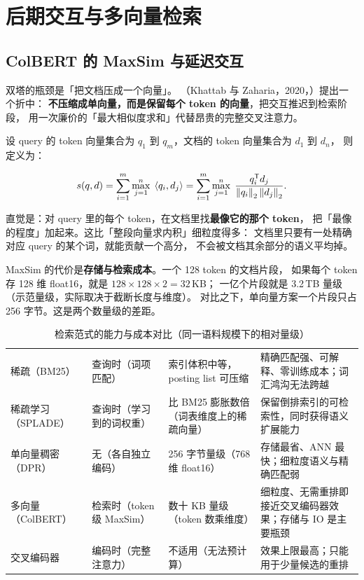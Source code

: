 \section{后期交互与多向量检索}

\subsection{ColBERT 的 MaxSim 与延迟交互}

双塔的瓶颈是「把文档压成一个向量」。
（Khattab 与 Zaharia，2020，\cite{khattab2020colbert}）提出一个折中：
\textbf{不压缩成单向量，而是保留每个 token 的向量}，把交互推迟到检索阶段，
用一次廉价的「最大相似度求和」代替昂贵的完整交叉注意力。

设 query 的 token 向量集合为 $q_1$ 到 $q_m$，文档的 token 向量集合为 $d_1$ 到 $d_n$，
则 定义为：

\begin{equation}
s(q, d) = \sum_{i=1}^{m} \max_{j=1}^{n} \; \left\langle q_i, d_j \right\rangle
= \sum_{i=1}^{m} \max_{j=1}^{n} \; \frac{q_i^{\mathsf{T}} d_j}{\left\lVert q_i \right\rVert_2 \left\lVert d_j \right\rVert_2} .
\label{eq:maxsim}
\end{equation}

直觉是：对 query 里的每个 token，在文档里找\textbf{最像它的那个 token}，
把「最像的程度」加起来。这比「整段向量求内积」细粒度得多：
文档里只要有一处精确对应 query 的某个词，就能贡献一个高分，
不会被文档其余部分的语义平均掉。

MaxSim 的代价是\textbf{存储与检索成本}。一个 128 token 的文档片段，
如果每个 token 存 128 维 float16，就是 $128 \times 128 \times 2 = 32$\,KB；
一亿个片段就是 3.2\,TB 量级（示范量级，实际取决于截断长度与维度）。
对比之下，单向量方案一个片段只占 256 字节。这是两个数量级的差距。

\begin{table}[htbp]
\centering
\caption{检索范式的能力与成本对比（同一语料规模下的相对量级）}
\label{tab:retrieval-paradigms}
\small
\begin{tabularx}{\textwidth}{L{2.3cm} L{2.2cm} L{2.2cm} Y}
\toprule
{} &  &  &  \\
\midrule
稀疏（BM25） & 查询时（词项匹配） &
索引体积中等，posting list 可压缩 &
精确匹配强、可解释、零训练成本；词汇鸿沟无法跨越 \\
\addlinespace
稀疏学习（SPLADE） & 查询时（学习到的词权重） &
比 BM25 膨胀数倍（词表维度上的稀疏向量） &
保留倒排索引的可检索性，同时获得语义扩展能力 \\
\addlinespace
单向量稠密（DPR） & 无（各自独立编码） &
256 字节量级（768 维 float16） &
存储最省、ANN 最快；细粒度语义与精确匹配弱 \\
\addlinespace
多向量（ColBERT） & 检索时（token 级 MaxSim） &
数十 KB 量级（token 数乘维度） &
细粒度、无需重排即接近交叉编码器效果；存储与 IO 是主要瓶颈 \\
\addlinespace
交叉编码器 & 编码时（完整注意力） &
不适用（无法预计算） &
效果上限最高；只能用于少量候选的重排 \\
\bottomrule
\end{tabularx}
\end{table}

